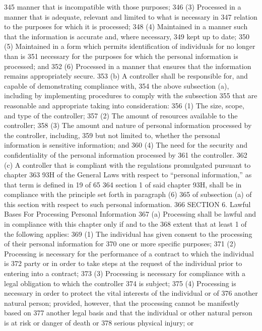 345 manner that is incompatible with those purposes;
346 (3) Processed in a manner that is adequate, relevant and limited to what is necessary in
347 relation to the purposes for which it is processed;
348 (4) Maintained in a manner such that the information is accurate and, where necessary,
349 kept up to date;
350 (5) Maintained in a form which permits identification of individuals for no longer than is
351 necessary for the purposes for which the personal information is processed; and
352 (6) Processed in a manner that ensures that the information remains appropriately secure.
353 (b) A controller shall be responsible for, and capable of demonstrating compliance with,
354 the above subsection (a), including by implementing procedures to comply with the subsection
355 that are reasonable and appropriate taking into consideration:
356 (1) The size, scope, and type of the controller;
357 (2) The amount of resources available to the controller;
358 (3) The amount and nature of personal information processed by the controller, including,
359 but not limited to, whether the personal information is sensitive information; and
360 (4) The need for the security and confidentiality of the personal information processed by
361 the controller.
362 (c) A controller that is compliant with the regulations promulgated pursuant to chapter
363 93H of the General Laws with respect to “personal information,” as that term is defined in
19 of 65
364 section 1 of said chapter 93H, shall be in compliance with the principle set forth in paragraph (6)
365 of subsection (a) of this section with respect to such personal information.
366 SECTION 6. Lawful Bases For Processing Personal Information
367 (a) Processing shall be lawful and in compliance with this chapter only if and to the
368 extent that at least 1 of the following applies:
369 (1) The individual has given consent to the processing of their personal information for
370 one or more specific purposes;
371 (2) Processing is necessary for the performance of a contract to which the individual is
372 party or in order to take steps at the request of the individual prior to entering into a contract;
373 (3) Processing is necessary for compliance with a legal obligation to which the controller
374 is subject;
375 (4) Processing is necessary in order to protect the vital interests of the individual or of
376 another natural person; provided, however, that the processing cannot be manifestly based on
377 another legal basis and that the individual or other natural person is at risk or danger of death or
378 serious physical injury; or
